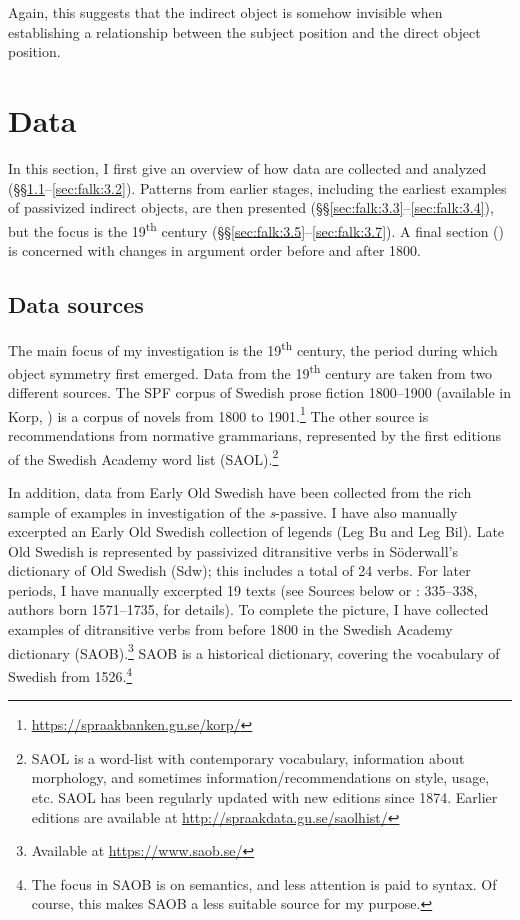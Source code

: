 \documentclass[output=paper]{langscibook}
\begin{document}
Again, this suggests that the indirect object is somehow invisible when establishing a relationship between the subject position and the direct object position.

\section{Data}\label{sec:falk:3}


In this section, I first give an overview of how data are collected and analyzed (§§\ref{sec:falk:3.1}--\ref{sec:falk:3.2}). Patterns from earlier stages, including the earliest examples of passivized indirect objects, are then presented (§§\ref{sec:falk:3.3}--\ref{sec:falk:3.4}), but the focus is the 19\textsuperscript{th} century (§§\ref{sec:falk:3.5}--\ref{sec:falk:3.7}). A final section () is concerned with changes in argument order before and after 1800.

\subsection{Data sources}
\label{sec:falk:3.1}

The main focus of my investigation is the 19\textsuperscript{th} century, the period during which object symmetry first emerged. Data from the 19\textsuperscript{th} century are taken from two different sources. The SPF corpus of Swedish prose fiction 1800–1900 (available in Korp, \citealt{BorinEtAl2012}) is a corpus of novels from 1800 to 1901.\footnote{\url{https://spraakbanken.gu.se/korp/}}  The other source is recommendations from normative grammarians, represented by the first editions of the Swedish Academy word list (SAOL).\footnote{SAOL is a word-list with contemporary vocabulary, information about morphology, and sometimes information/recommendations on style, usage, etc. SAOL has been regularly updated with new editions since 1874. Earlier editions are available at \url{http://spraakdata.gu.se/saolhist/}{} }


In addition, data from Early Old Swedish have been collected from the rich sample of examples in  investigation of the \textit{s}{}-passive. I have also manually excerpted an Early Old Swedish collection of legends (Leg Bu and Leg Bil). Late Old Swedish is represented by passivized ditransitive verbs in Söderwall’s dictionary of Old Swedish (Sdw); this includes a total of 24 verbs. For later periods, I have manually excerpted 19 texts (see Sources below or \citealt{Falk1993}: 335–338, authors born 1571–1735, for details). To complete the picture, I have collected examples of ditransitive verbs from before 1800 in the Swedish Academy dictionary (SAOB).\footnote{Available at \url{https://www.saob.se/}}  SAOB is a historical dictionary, covering the vocabulary of Swedish from 1526.\footnote{The focus in SAOB is on semantics, and less attention is paid to syntax. Of course, this makes SAOB a less suitable source for my purpose.}
\end{document}
